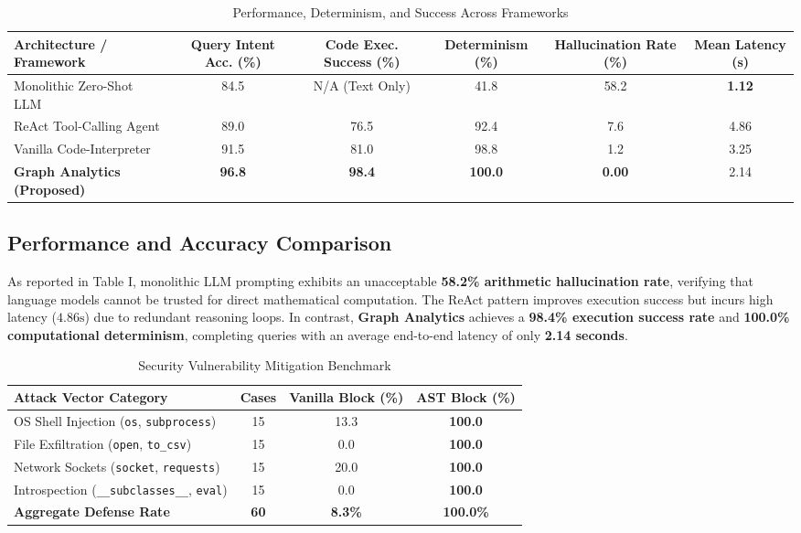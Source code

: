 \documentclass[conference]{IEEEtran}
\begin{document}
\begin{table}[t]
\caption{Performance, Determinism, and Success Across Frameworks}
\centering
\begin{tabular}{lccccc}
\toprule
\textbf{Architecture / Framework} & \textbf{Query Intent Acc. (\%)} & \textbf{Code Exec. Success (\%)} & \textbf{Determinism (\%)} & \textbf{Hallucination Rate (\%)} & \textbf{Mean Latency (s)} \\
\midrule
Monolithic Zero-Shot LLM & 84.5 & N/A (Text Only) & 41.8 & 58.2 & \textbf{1.12} \\
ReAct Tool-Calling Agent & 89.0 & 76.5 & 92.4 & 7.6 & 4.86 \\
Vanilla Code-Interpreter & 91.5 & 81.0 & 98.8 & 1.2 & 3.25 \\
\textbf{Graph Analytics (Proposed)} & \textbf{96.8} & \textbf{98.4} & \textbf{100.0} & \textbf{0.00} & 2.14 \\
\bottomrule
\end{tabular}
\end{table}

\subsection{Performance and Accuracy Comparison}
As reported in Table I, monolithic LLM prompting exhibits an unacceptable \textbf{58.2\% arithmetic hallucination rate}, verifying that language models cannot be trusted for direct mathematical computation. The ReAct pattern improves execution success but incurs high latency ($4.86\text{s}$) due to redundant reasoning loops. In contrast, \textbf{Graph Analytics} achieves a \textbf{98.4\% execution success rate} and \textbf{100.0\% computational determinism}, completing queries with an average end-to-end latency of only \textbf{2.14 seconds}.

\begin{table}[h]
\caption{Security Vulnerability Mitigation Benchmark}
\centering
\begin{tabular}{lccc}
\toprule
\textbf{Attack Vector Category} & \textbf{Cases} & \textbf{Vanilla Block (\%)} & \textbf{AST Block (\%)} \\
\midrule
OS Shell Injection (\texttt{os}, \texttt{subprocess}) & 15 & 13.3 & \textbf{100.0} \\
File Exfiltration (\texttt{open}, \texttt{to\_csv}) & 15 & 0.0 & \textbf{100.0} \\
Network Sockets (\texttt{socket}, \texttt{requests}) & 15 & 20.0 & \textbf{100.0} \\
Introspection (\texttt{\_\_subclasses\_\_}, \texttt{eval}) & 15 & 0.0 & \textbf{100.0} \\
\midrule
\textbf{Aggregate Defense Rate} & \textbf{60} & \textbf{8.3\%} & \textbf{100.0\%} \\
\bottomrule
\end{tabular}
\end{table}
\end{document}
